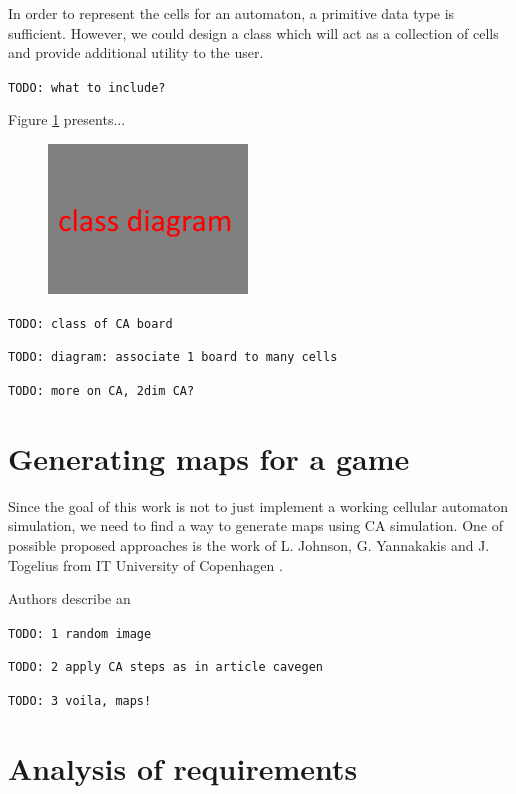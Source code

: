 \documentclass[12pt]{report}
\newcommand{\todo}[1]{}
\renewcommand{\todo}[1]{{\color{red} \par \noindent \footnotesize \texttt{TODO: {#1} }}}
\begin{document}
In order to represent the cells for an automaton, a primitive data type is sufficient. However, we could design a class which will act as a collection of cells and provide additional utility to the user. 


\todo{what to include?}
Figure \ref{fig:img001} presents...

\begin{figure}[h]
	\centering
	\includegraphics[width=0.7\linewidth]{images/img001}
	\caption{}
	\label{fig:img001}
\end{figure}


\todo{class of CA board}
\todo{diagram: associate 1 board to many cells}

 

\todo{more on CA, 2dim CA?}





\section{Generating maps for a game}

Since the goal of this work is not to just implement a working cellular automaton simulation, we need to find a way to generate maps using CA simulation. One of possible proposed approaches is the work of L. Johnson, G. Yannakakis and J. Togelius from IT University of Copenhagen \autocite{johnson2010cellular}. 

Authors describe an 


\todo{1 random image}
\todo{2 apply CA steps as in article cavegen}
\todo{3 voila, maps!}



\section{Analysis of requirements}
\end{document}

